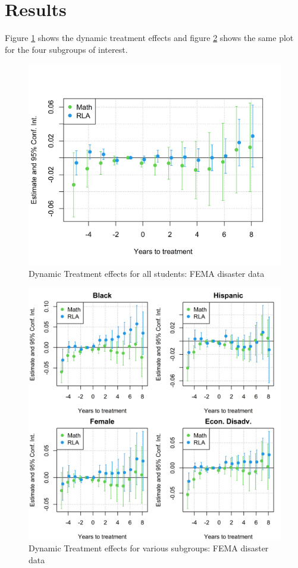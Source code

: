 \section{Results} \label{Results}

Figure \ref{ResultsPlot} shows the dynamic treatment effects and figure \ref{ResultsPlotSub} shows the same plot for the four subgroups of interest. 

\begin{figure}[!h]
	\centering
	\includegraphics[scale=1]{"../Code & Data/ResultsPlot.png"}
	\caption{Dynamic Treatment effects for all students: FEMA disaster data}
	\label{ResultsPlot}
\end{figure}

\begin{figure}[!h]
	\centering
	\includegraphics[scale=1]{"../Code & Data/ResultsPlotSub.png"}
	\caption{Dynamic Treatment effects for various subgroups: FEMA disaster data}
	\label{ResultsPlotSub}
\end{figure}

